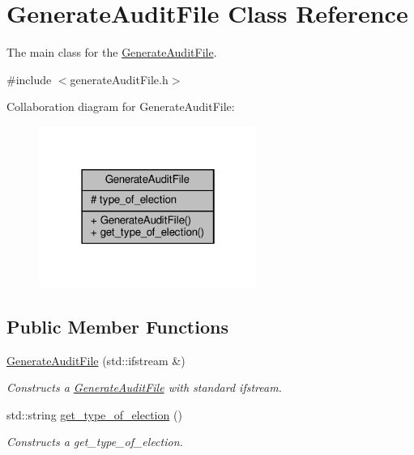 \hypertarget{classGenerateAuditFile}{}\section{Generate\+Audit\+File Class Reference}
\label{classGenerateAuditFile}


The main class for the \hyperlink{classGenerateAuditFile}{Generate\+Audit\+File}.  




{\ttfamily \#include $<$generate\+Audit\+File.\+h$>$}



Collaboration diagram for Generate\+Audit\+File\+:\nopagebreak
\begin{figure}[H]
\begin{center}
\leavevmode
\includegraphics[width=202pt]{classGenerateAuditFile__coll__graph}
\end{center}
\end{figure}
\subsection*{Public Member Functions}
\begin{DoxyCompactItemize}
\item 
\hyperlink{classGenerateAuditFile_ac3aed11997b1dd1ca73642b40dfc8d70}{Generate\+Audit\+File} (std\+::ifstream \&)
\begin{DoxyCompactList}\small\item\em Constructs a \hyperlink{classGenerateAuditFile}{Generate\+Audit\+File} with standard ifstream. \end{DoxyCompactList}\item 
std\+::string \hyperlink{classGenerateAuditFile_acd98de766d58b3b55107b998b58810f3}{get\+\_\+type\+\_\+of\+\_\+election} ()
\begin{DoxyCompactList}\small\item\em Constructs a get\+\_\+type\+\_\+of\+\_\+election. \end{DoxyCompactList}\end{DoxyCompactItemize}
